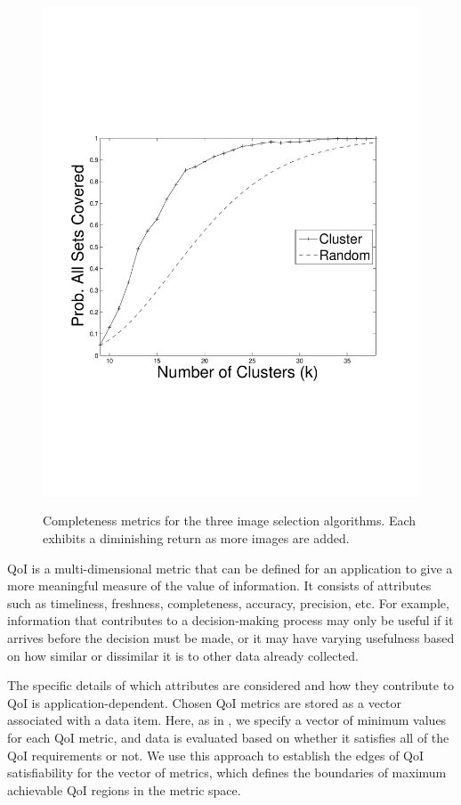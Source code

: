 \begin{figure}
{        \includegraphics[clip=true, trim = 16mm 65mm 25mm 70mm, scale=0.23]{figures/cluster/perc_all_sets_covered_vary_k.pdf}
        \label{fig:clusterAvgNumSetsCov}
        }        
   \caption{Completeness metrics for the three image selection algorithms. Each exhibits a diminishing return as more images are added.}
   \label{fig:completeness_exp_results}
\end{figure}

QoI is a multi-dimensional metric that can be defined for an application to give a more meaningful measure of the value of information.  It consists of attributes such as  timeliness, freshness, completeness, accuracy, precision, etc.  
For example, information that contributes to a decision-making process may only be useful if it arrives before the decision must be made, or it may have varying usefulness based on how similar or dissimilar it is to other data already collected.

The specific details of which attributes are considered and how they contribute to QoI is application-dependent.  Chosen QoI metrics are stored as a vector associated with a data item.  
Here, as in \cite{qoi_aware_tactical_mil_nets}, we specify a vector of minimum values for each QoI metric, and 
data is evaluated based on whether it satisfies all of the QoI requirements or not.  We use this approach to establish the edges of QoI satisfiability for the vector of metrics, which defines the boundaries of maximum achievable QoI regions in the metric space.

